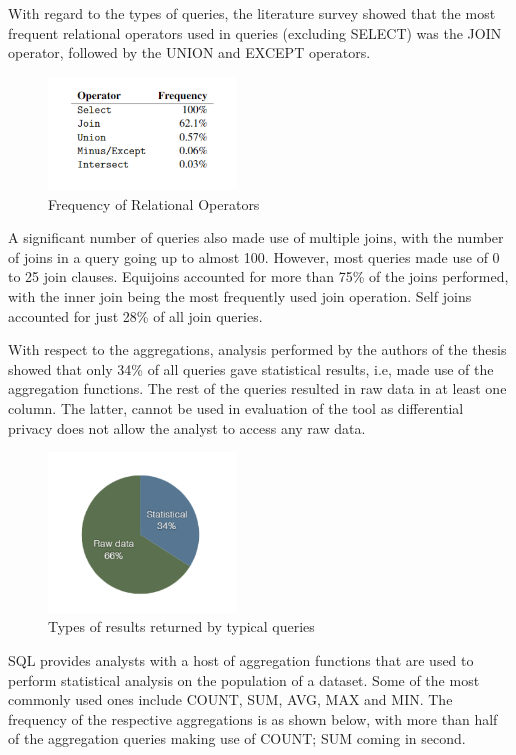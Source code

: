 \documentclass[acmsmall]{acmart}
\begin{document}
With regard to the types of queries, the literature survey showed that the most frequent relational operators used in queries (excluding SELECT) was the JOIN operator, followed by the UNION and EXCEPT operators.

\begin{figure}[htp]
    \centering
    \includegraphics[width=5cm]{Fig 4.2.1.png}
    \caption{Frequency of Relational Operators}
    \label{fig:4.2.1}
\end{figure}

A significant number of queries also made use of multiple joins, with the number of joins in a query going up to almost 100. However, most queries made use of 0 to 25 join clauses. Equijoins accounted for more than 75\% of the joins performed, with the inner join being the most frequently used join operation. Self joins accounted for just 28\% of all join queries.

With respect to the aggregations, analysis performed by the authors of the thesis showed that only 34\% of all queries gave statistical results, i.e, made use of the aggregation functions. The rest of the queries resulted in raw data in at least one column. The latter, cannot be used in evaluation of the tool as differential privacy does not allow the analyst to access any raw data.

\begin{figure}[htp]
    \centering
    \includegraphics[width=5cm]{Fig 4.2.2.png}
    \caption{Types of results returned by typical queries}
    \label{fig:4.2.2}
\end{figure}

SQL provides analysts with a host of aggregation functions that are used to perform statistical analysis on the population of a dataset. Some of the most commonly used ones include COUNT, SUM, AVG, MAX and MIN. The frequency of the respective aggregations is as shown below, with more than half of the aggregation queries making use of COUNT; SUM coming in second.
\end{document}
